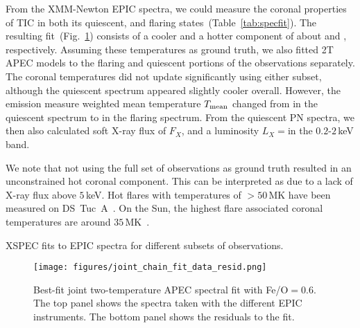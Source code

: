 \documentclass[twocolumn]{aastex631}
\begin{document}
From the XMM-Newton EPIC spectra, we could measure the coronal properties of TIC in both its quiescent, and flaring states~(Table~\ref{tab:specfit}). The resulting fit~(Fig.~\ref{fig:spec_joint_all}) consists of a cooler and a hotter component of about \Tcool and \Thot, respectively. Assuming these temperatures as ground truth, we also fitted 2T APEC models to the flaring and quiescent portions of the observations separately. The coronal temperatures did not update significantly using either subset, although the quiescent spectrum appeared slightly cooler overall. However, the emission measure weighted mean temperature $T_{\rm mean}$ changed from \Tqmean in the quiescent spectrum to \Tfmean in the flaring spectrum. From the quiescent PN spectra, we then also calculated soft X-ray flux of $F_X$\FX, and a luminosity $L_X=$\LXquiet in the $0.2$-$2\,$keV band. %

We note that not using the full set of observations as ground truth resulted in an unconstrained hot coronal component. This can be interpreted as due to a lack of X-ray flux above $5\,$keV. Hot flares with temperatures of $>50\,$MK have been measured on DS~Tuc~A~\citep{pillitteri2011xray}. On the Sun, the highest flare associated coronal temperatures are around $35\,$MK~\citep{kay2003soft}.


 \begin{table}
\centering
    \caption{XSPEC fits to EPIC spectra for different subsets of observations.}
    
        \label{tab:specfit}
\end{table}


\begin{figure}
    \begin{centering}
        \texttt{[image: figures/joint\_chain\_fit\_data\_resid.png]}
        \caption{
         Best-fit joint two-temperature APEC spectral fit with Fe/O$=0.6$. The top panel shows the spectra taken with the different EPIC instruments. The bottom panel shows the residuals to the fit.
        }
        \label{fig:spec_joint_all}
    \end{centering}
\end{figure}
\end{document}
